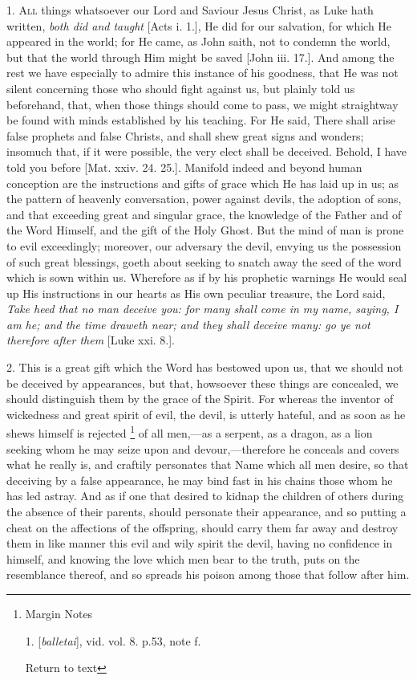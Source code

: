 1. A\textsc{ll} things whatsoever
our Lord and Saviour Jesus Christ, as Luke hath written, \emph{both did
and taught} [Acts i. 1.], He did for our salvation, for which He
appeared in the world; for He came, as John saith, not to
condemn the world, but that the world through Him might be saved [John
iii. 17.]. And among the rest we have especially to admire this
instance of his goodness, that He was not silent concerning those who
should fight against us, but plainly told us beforehand, that, when
those things should come to pass, we might straightway be found with
minds established by his teaching. For He said, There shall arise
false prophets and false Christs, and shall shew great signs and
wonders; insomuch that, if it were possible, the very elect shall be
deceived. Behold, I have told you before [Mat. xxiv. 24. 25.].
Manifold indeed and beyond human conception are the instructions and
gifts of grace which He has laid up in us; as the pattern of heavenly
conversation, power against devils, the adoption of sons, and that
exceeding great and singular grace, the knowledge of the Father and of
the Word Himself, and the gift of the Holy Ghost. But the mind of man
is prone to evil exceedingly; moreover, our adversary the devil,
envying us the possession of such great blessings, goeth about seeking
to snatch away the seed of the word which is sown within us. Wherefore
as if by his prophetic warnings He would seal up His instructions in
our hearts as His own peculiar treasure, the Lord said, \emph{Take heed
that no man deceive you: for many shall come in my name, saying, I am
he; and the time draweth near; and they shall deceive many: go ye not
therefore after them} [Luke xxi. 8.].

2. This is a great gift which the Word has
bestowed upon us, that we should not be deceived by appearances, but
that, howsoever these things are concealed, we should distinguish them
by the grace of the Spirit. For whereas the inventor of wickedness and
great spirit of evil, the devil, is utterly hateful, and as soon as he
shews himself is rejected \footnote{Margin Notes

1. [\emph{balletai}], vid. vol. 8. p.53, note f.

Return to text}
of all men,—as a serpent, as a dragon, as a lion seeking whom he may
seize upon and devour,—therefore he conceals and covers what he
really is, and craftily personates that Name which all men desire, so
that deceiving by a false appearance, he may bind fast in his chains
those whom he has led astray. And as if one that desired to kidnap the
children of others during the absence of their parents, should
personate their appearance, and so putting a cheat on the affections
of the offspring, should carry them far away and destroy them in
like manner this evil and wily spirit the devil, having no confidence
in himself, and knowing the love which men bear to the truth, puts on
the resemblance thereof, and so spreads his poison among those that
follow after him.

